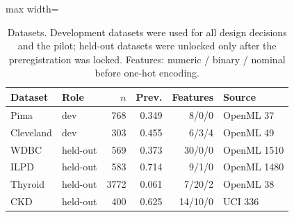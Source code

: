 \begin{table}[t]
\centering
\scriptsize
\setlength{\tabcolsep}{3pt}
\caption{Datasets. Development datasets were used for all design decisions and the pilot; held-out datasets were unlocked only after the preregistration was locked. Features: numeric / binary / nominal before one-hot encoding.}
\label{tab:datasets}
\begin{adjustbox}{max width=\linewidth}
\begin{tabular}{llrrrl}
\toprule
Dataset & Role & $n$ & Prev. & Features & Source \\
\midrule
Pima & dev & 768 & 0.349 & 8/0/0 & OpenML 37 \\
Cleveland & dev & 303 & 0.455 & 6/3/4 & OpenML 49 \\
WDBC & held-out & 569 & 0.373 & 30/0/0 & OpenML 1510 \\
ILPD & held-out & 583 & 0.714 & 9/1/0 & OpenML 1480 \\
Thyroid & held-out & 3772 & 0.061 & 7/20/2 & OpenML 38 \\
CKD & held-out & 400 & 0.625 & 14/10/0 & UCI 336 \\
\bottomrule
\end{tabular}
\end{adjustbox}
\end{table}
